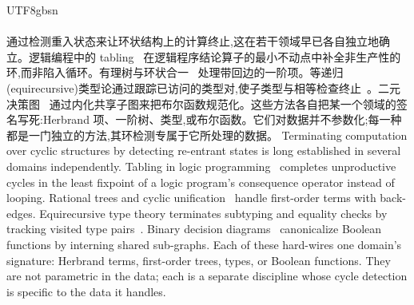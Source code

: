 \begin{CJK*}{UTF8}{gbsn}
  \paragraph{}
  \ifTablambdaChinese
  通过检测重入状态来让环状结构上的计算终止,这在若干领域早已各自独立地确立。逻辑编程中的 tabling~\cite{tamaki1986-tabled-resolution, chen1996-tabled-evaluation-delaying, vanemden1976-predicate-logic-semantics} 在逻辑程序结论算子的最小不动点中补全非生产性的环,而非陷入循环。有理树与环状合一~\cite{colmerauer1984-trees, courcelle1983-infinite-trees} 处理带回边的一阶项。等递归(equirecursive)类型论通过跟踪已访问的类型对,使子类型与相等检查终止~\cite{amadio1993-subtyping-recursive-types, brandt1998-coinductive-type-equality}。二元决策图~\cite{bryant1986-bdd} 通过内化共享子图来把布尔函数规范化。这些方法各自把某一个领域的签名写死:Herbrand 项、一阶树、类型,或布尔函数。它们对数据并不参数化;每一种都是一门独立的方法,其环检测专属于它所处理的数据。
  \else
  Terminating computation over cyclic structures by detecting re-entrant states is long established in several domains independently. Tabling in logic programming~\cite{tamaki1986-tabled-resolution, chen1996-tabled-evaluation-delaying, vanemden1976-predicate-logic-semantics} completes unproductive cycles in the least fixpoint of a logic program's consequence operator instead of looping. Rational trees and cyclic unification~\cite{colmerauer1984-trees, courcelle1983-infinite-trees} handle first-order terms with back-edges. Equirecursive type theory terminates subtyping and equality checks by tracking visited type pairs~\cite{amadio1993-subtyping-recursive-types, brandt1998-coinductive-type-equality}. Binary decision diagrams~\cite{bryant1986-bdd} canonicalize Boolean functions by interning shared sub-graphs. Each of these hard-wires one domain's signature: Herbrand terms, first-order trees, types, or Boolean functions. They are not parametric in the data; each is a separate discipline whose cycle detection is specific to the data it handles.
  \fi


\end{CJK*}
